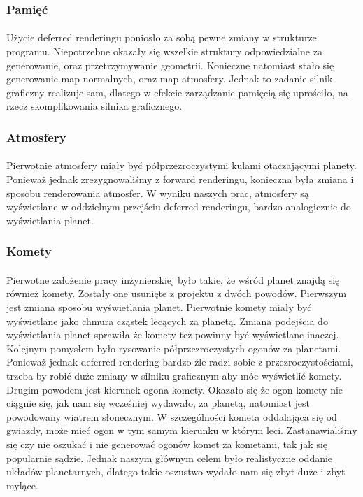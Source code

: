 \subsubsection{Pamięć}\label{ssub:pamiec}
\paragraph{}

Użycie deferred renderingu poniosło za sobą pewne zmiany w strukturze programu. Niepotrzebne okazały się wszelkie struktury odpowiedzialne za generowanie, oraz przetrzymywanie geometrii. Konieczne natomiast stało się generowanie map normalnych, oraz map atmosfery. Jednak to zadanie silnik graficzny realizuje sam, dlatego w efekcie zarządzanie pamięcią się uprościło, na rzecz skomplikowania silnika graficznego.

\subsubsection{Atmosfery}\label{ssub:atmosfery}
\paragraph{}

Pierwotnie atmosfery miały być półprzezroczystymi kulami otaczającymi planety. Ponieważ jednak zrezygnowaliśmy z forward renderingu, konieczna była zmiana i sposobu renderowania atmosfer. W wyniku naszych prac, atmosfery są wyświetlane w oddzielnym przejściu deferred renderingu, bardzo analogicznie do wyświetlania planet.

\subsubsection{Komety}\label{ssub:komety}
\paragraph{}

Pierwotne założenie pracy inżynierskiej było takie, że wśród planet znajdą się również komety. Zostały one usunięte z projektu z dwóch powodów. Pierwszym jest zmiana sposobu wyświetlania planet. Pierwotnie komety miały być wyświetlane jako chmura cząstek lecących za planetą. Zmiana podejścia do wyświetlania planet sprawiła że komety też powinny być wyświetlane inaczej. Kolejnym pomysłem było rysowanie półprzezroczystych ogonów za planetami. Ponieważ jednak deferred rendering bardzo źle radzi sobie z przezroczystościami, trzeba by robić duże zmiany w silniku graficznym aby móc wyświetlić komety. Drugim powodem jest kierunek ogona komety. Okazało się że ogon komety nie ciągnie się, jak nam się wcześniej wydawało, za planetą, natomiast jest powodowany wiatrem słonecznym. W szczególności kometa oddalająca się od gwiazdy, może mieć ogon w tym samym kierunku w którym leci. Zastanawialiśmy się czy nie oszukać i nie generować ogonów komet za kometami, tak jak się popularnie sądzie. Jednak naszym głównym celem było realistyczne oddanie układów planetarnych, dlatego takie oszustwo wydało nam się zbyt duże i zbyt mylące.

